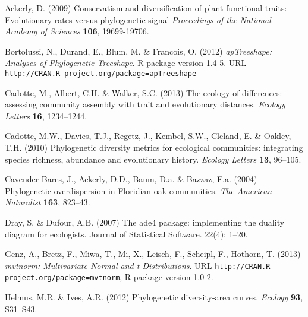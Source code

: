 \documentclass{bioinfo}
\begin{document}
\begin{thebibliography}{30}
\providecommand{\natexlab}[1]{#1}
\providecommand{\url}[1]{\texttt{#1}}
\providecommand{\urlprefix}{URL }

Ackerly, D. (2009) Conservatism and diversification of plant functional traits: Evolutionary rates versus phylogenetic signal \emph{Proceedings of the National Academy of
  Sciences} \textbf{106}, 19699-19706.

 Bortolussi, N., Durand, E., Blum, M. \&
  Francois, O. (2012) \emph{apTreeshape: Analyses of Phylogenetic
    Treeshape}. R package version
  1.4-5. \urlprefix\url{http://CRAN.R-project.org/package=apTreeshape}

Cadotte, M., Albert, C.H. \& Walker, S.C. (2013) The ecology of differences:
  assessing community assembly with trait and evolutionary distances.
  \emph{Ecology Letters} \textbf{16}, 1234--1244.

Cadotte, M.W., Davies, T.J., Regetz, J., Kembel, S.W., Cleland, E. \& Oakley,
  T.H. (2010) Phylogenetic diversity metrics for ecological communities:
  integrating species richness, abundance and evolutionary history.
  \emph{Ecology Letters} \textbf{13}, 96--105.

Cavender-Bares, J., Ackerly, D.D., Baum, D.a. \& Bazzaz, F.a. (2004)
  {Phylogenetic overdispersion in Floridian oak communities}. \emph{The
  American Naturalist} \textbf{163}, 823--43.

 Dray, S. \&
  Dufour, A.B. (2007) The ade4 package: implementing the duality
  diagram for ecologists. Journal of Statistical Software. 22(4):
  1--20.

 Genz, A., Bretz, F., Miwa, T., Mi,
  X., Leisch, F., Scheipl, F., Hothorn, T. (2013) \emph{mvtnorm:
    Multivariate Normal and t
    Distributions}. \urlprefix\url{http://CRAN.R-project.org/package=mvtnorm},
  R package version 1.0-2.

Helmus, M.R. \& Ives, A.R. (2012) Phylogenetic diversity-area curves.
  \emph{Ecology} \textbf{93}, S31--S43.


\end{thebibliography}
\end{document}
